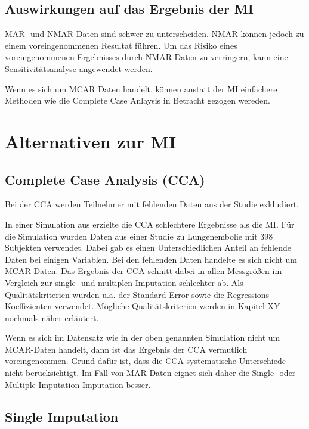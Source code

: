 \subsection{Auswirkungen auf das Ergebnis der MI}

MAR- und NMAR Daten sind schwer zu unterscheiden. NMAR können jedoch zu einem voreingenommenen Resultat führen.  Um das 
Risiko eines voreingenommenen Ergebnisses durch NMAR Daten zu verringern, kann eine Sensitivitätsanalyse angewendet 
werden. \autocite[157]{Sterne2009} 

Wenn es sich um MCAR Daten handelt, können anstatt der MI einfachere Methoden wie die Complete Case Anlaysis in Betracht 
gezogen wereden. \autocite*[1088]{Donders2006} 

\section{Alternativen zur MI}
\label{section:alternatives}

\subsection{Complete Case Analysis (CCA)}

Bei der CCA werden Teilnehmer mit fehlenden Daten aus der Studie exkludiert. \autocite[3]{Jakobsen2017} 

In einer Simulation aus \textcite[]{VanderHeijden2006} erzielte die CCA schlechtere Ergebnisse als die MI. Für 
die Simulation wurden Daten aus einer Studie zu Lungenembolie mit 398 Subjekten verwendet. Dabei gab es 
einen Unterschiedlichen Anteil an fehlende Daten bei einigen Variablen. Bei den fehlenden Daten handelte es 
sich nicht um MCAR Daten.  Das Ergebnis der CCA schnitt dabei in allen Messgrößen im Vergleich zur single- 
und multiplen Imputation schlechter ab. Als Qualitätskriterien wurden u.a. der Standard Error sowie die 
Regressions Koeffizienten verwendet. Mögliche Qualitätskriterien werden in Kapitel XY nochmals näher erläutert.

Wenn es sich im Datensatz wie in der oben genannten Simulation nicht um MCAR-Daten handelt, dann ist das Ergebnis der 
CCA vermutlich voreingenommen. Grund dafür ist, dass die CCA systematische Unterschiede nicht 
berücksichtigt. \autocite[157]{Sterne2009} Im Fall von MAR-Daten eignet sich daher die Single- oder Multiple 
Imputation Imputation besser. \autocite[1088]{Donders2006}


\subsection{Single Imputation}

